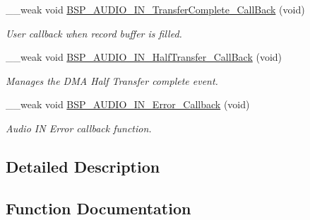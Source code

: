 \begin{DoxyCompactItemize}
\+\_\+\+\_\+weak void \mbox{\hyperlink{group___s_t_m32_f4___d_i_s_c_o_v_e_r_y___a_u_d_i_o___i_n___private___functions_ga345932dd9f27ba5e7fbf54fe6e9a18d3}{B\+S\+P\+\_\+\+A\+U\+D\+I\+O\+\_\+\+I\+N\+\_\+\+Transfer\+Complete\+\_\+\+Call\+Back}} (void)
\begin{DoxyCompactList}\small\item\em User callback when record buffer is filled. \end{DoxyCompactList}\item 
\mbox{\label{group___s_t_m32_f4___d_i_s_c_o_v_e_r_y___a_u_d_i_o___i_n___private___functions_ga58049b7f6b2a1f47c114788a932ca1f7}} 
\+\_\+\+\_\+weak void \mbox{\hyperlink{group___s_t_m32_f4___d_i_s_c_o_v_e_r_y___a_u_d_i_o___i_n___private___functions_ga58049b7f6b2a1f47c114788a932ca1f7}{B\+S\+P\+\_\+\+A\+U\+D\+I\+O\+\_\+\+I\+N\+\_\+\+Half\+Transfer\+\_\+\+Call\+Back}} (void)
\begin{DoxyCompactList}\small\item\em Manages the D\+MA Half Transfer complete event. \end{DoxyCompactList}\item 
\mbox{\label{group___s_t_m32_f4___d_i_s_c_o_v_e_r_y___a_u_d_i_o___i_n___private___functions_gaffd34f15e16f10cbe6e4f6fd35cd0ea1}} 
\+\_\+\+\_\+weak void \mbox{\hyperlink{group___s_t_m32_f4___d_i_s_c_o_v_e_r_y___a_u_d_i_o___i_n___private___functions_gaffd34f15e16f10cbe6e4f6fd35cd0ea1}{B\+S\+P\+\_\+\+A\+U\+D\+I\+O\+\_\+\+I\+N\+\_\+\+Error\+\_\+\+Callback}} (void)
\begin{DoxyCompactList}\small\item\em Audio IN Error callback function. \end{DoxyCompactList}\end{DoxyCompactItemize}


\subsection{Detailed Description}


\subsection{Function Documentation}
\mbox{\label{group___s_t_m32_f4___d_i_s_c_o_v_e_r_y___a_u_d_i_o___i_n___private___functions_ga5a40f0d40f80fd71fd16fbb4e7fb3b7d}} 

